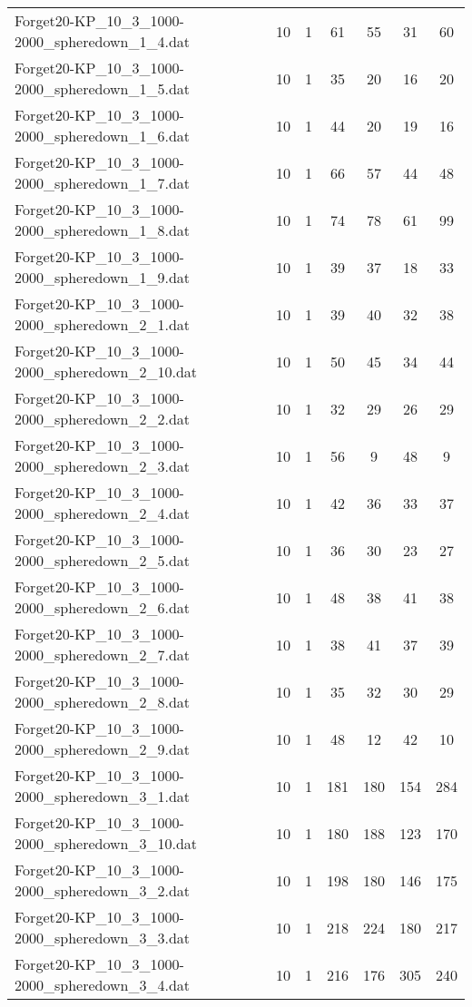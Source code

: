\begin{table}[!ht]
\begin{tabular}{lcccccc}
Forget20-KP\_10\_3\_1000-2000\_spheredown\_1\_4.dat & 10 & 1 & 61 & 55 & 31 & 60 \\
Forget20-KP\_10\_3\_1000-2000\_spheredown\_1\_5.dat & 10 & 1 & 35 & 20 & 16 & 20 \\
Forget20-KP\_10\_3\_1000-2000\_spheredown\_1\_6.dat & 10 & 1 & 44 & 20 & 19 & 16 \\
Forget20-KP\_10\_3\_1000-2000\_spheredown\_1\_7.dat & 10 & 1 & 66 & 57 & 44 & 48 \\
Forget20-KP\_10\_3\_1000-2000\_spheredown\_1\_8.dat & 10 & 1 & 74 & 78 & 61 & 99 \\
Forget20-KP\_10\_3\_1000-2000\_spheredown\_1\_9.dat & 10 & 1 & 39 & 37 & 18 & 33 \\
Forget20-KP\_10\_3\_1000-2000\_spheredown\_2\_1.dat & 10 & 1 & 39 & 40 & 32 & 38 \\
Forget20-KP\_10\_3\_1000-2000\_spheredown\_2\_10.dat & 10 & 1 & 50 & 45 & 34 & 44 \\
Forget20-KP\_10\_3\_1000-2000\_spheredown\_2\_2.dat & 10 & 1 & 32 & 29 & 26 & 29 \\
Forget20-KP\_10\_3\_1000-2000\_spheredown\_2\_3.dat & 10 & 1 & 56 & 9 & 48 & 9 \\
Forget20-KP\_10\_3\_1000-2000\_spheredown\_2\_4.dat & 10 & 1 & 42 & 36 & 33 & 37 \\
Forget20-KP\_10\_3\_1000-2000\_spheredown\_2\_5.dat & 10 & 1 & 36 & 30 & 23 & 27 \\
Forget20-KP\_10\_3\_1000-2000\_spheredown\_2\_6.dat & 10 & 1 & 48 & 38 & 41 & 38 \\
Forget20-KP\_10\_3\_1000-2000\_spheredown\_2\_7.dat & 10 & 1 & 38 & 41 & 37 & 39 \\
Forget20-KP\_10\_3\_1000-2000\_spheredown\_2\_8.dat & 10 & 1 & 35 & 32 & 30 & 29 \\
Forget20-KP\_10\_3\_1000-2000\_spheredown\_2\_9.dat & 10 & 1 & 48 & 12 & 42 & 10 \\
Forget20-KP\_10\_3\_1000-2000\_spheredown\_3\_1.dat & 10 & 1 & 181 & 180 & 154 & 284 \\
Forget20-KP\_10\_3\_1000-2000\_spheredown\_3\_10.dat & 10 & 1 & 180 & 188 & 123 & 170 \\
Forget20-KP\_10\_3\_1000-2000\_spheredown\_3\_2.dat & 10 & 1 & 198 & 180 & 146 & 175 \\
Forget20-KP\_10\_3\_1000-2000\_spheredown\_3\_3.dat & 10 & 1 & 218 & 224 & 180 & 217 \\
Forget20-KP\_10\_3\_1000-2000\_spheredown\_3\_4.dat & 10 & 1 & 216 & 176 & 305 & 240 \\

\end{tabular}
\end{table}
